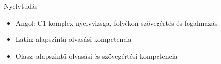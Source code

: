 Nyelvtudás
  
  \begin{itemize}
    \item{Angol: C1 komplex nyelvvizsga, folyékon szövegértés és fogalmazás}
    \item{Latin: alapszintű olvasási kompetencia}
    \item{Olasz: alapszintű olvasási és szövegértési kompetencia}
  \end{itemize}

\thispagestyle{fancy}

